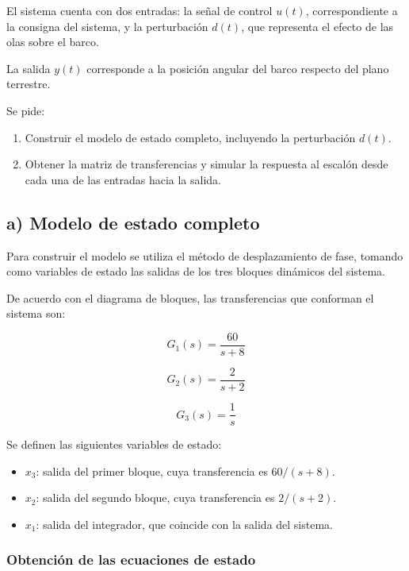 \documentclass[12pt,a4paper]{article}
\begin{document}
El sistema cuenta con dos entradas: la señal de control $u(t)$, correspondiente a la consigna del sistema, y la perturbación $d(t)$, que representa el efecto de las olas sobre el barco.

La salida $y(t)$ corresponde a la posición angular del barco respecto del plano terrestre.

Se pide:

\begin{enumerate}
\item Construir el modelo de estado completo, incluyendo la perturbación $d(t)$.
\item Obtener la matriz de transferencias y simular la respuesta al escalón desde cada una de las entradas hacia la salida.
\end{enumerate}
\subsection*{a) Modelo de estado completo}
Para construir el modelo se utiliza el método de desplazamiento de fase, tomando como variables de estado las salidas de los tres bloques dinámicos del sistema.

De acuerdo con el diagrama de bloques, las transferencias que conforman el sistema son:

\begin{equation}G_1(s)=\frac{60}{s+8}\end{equation}

\begin{equation}G_2(s)=\frac{2}{s+2}\end{equation}

\begin{equation}G_3(s)=\frac{1}{s}\end{equation}

Se definen las siguientes variables de estado:

\begin{itemize}
\item $x_3$: salida del primer bloque, cuya transferencia es $60/(s+8)$.
\item $x_2$: salida del segundo bloque, cuya transferencia es $2/(s+2)$.
\item $x_1$: salida del integrador, que coincide con la salida del sistema.
\end{itemize}
\subsubsection*{Obtención de las ecuaciones de estado}
\end{document}
